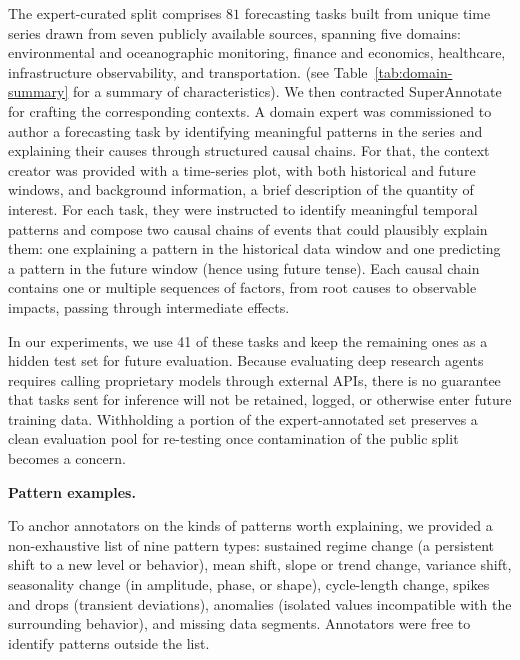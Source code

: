 \documentclass[]{servicenow}
\newcommand{\paragraphtight}[1]{%
  \par\vspace{-0.75\parskip}\vspace{0.3em}%
  \noindent\textbf{#1}\hspace{0.4em}\ignorespaces
}
\begin{document}
The expert-curated split comprises $81$ forecasting tasks built from unique time series drawn from seven publicly available sources, spanning five domains: environmental and oceanographic monitoring, finance and economics, healthcare, infrastructure observability, and transportation.
(see Table~\ref{tab:domain-summary} for a summary of characteristics).
We then contracted SuperAnnotate for crafting the corresponding contexts.
A domain expert was commissioned to author a forecasting task by identifying meaningful patterns in the series and explaining their causes through structured causal chains.
For that, the context creator was provided with a time-series plot, with both historical and future windows, and background information, a brief description of the quantity of interest.
For each task, they were instructed to identify meaningful temporal patterns and compose two causal chains of events that could plausibly explain them:
one explaining a pattern in the historical data window and one predicting a pattern in the future window (hence using future tense).
Each causal chain contains one or multiple sequences of factors, from root causes to observable impacts, passing through intermediate effects.

In our experiments, we use 41 of these tasks and keep the remaining ones as a hidden test set for future evaluation. Because evaluating deep research agents requires calling proprietary models through external APIs, there is no guarantee that tasks sent for inference will not be retained, logged, or otherwise enter future training data. Withholding a portion of the expert-annotated set preserves a clean evaluation pool for re-testing once contamination of the public split becomes a concern.

\paragraphtight{Pattern examples.}
To anchor annotators on the kinds of patterns worth explaining, we provided a non-exhaustive list of nine pattern types: sustained regime change (a persistent shift to a new level or behavior), mean shift, slope or trend change, variance shift, seasonality change (in amplitude, phase, or shape), cycle-length change, spikes and drops (transient deviations), anomalies (isolated values incompatible with the surrounding behavior), and missing data segments.
Annotators were free to identify patterns outside the list.

\end{document}
